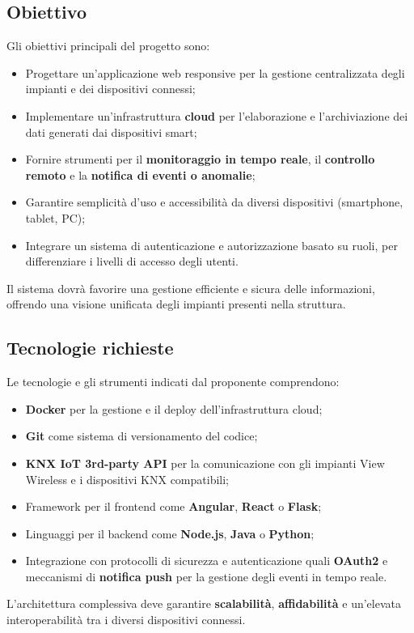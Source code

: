 \documentclass[a4paper,12pt]{article}
\begin{document}
{{{    \subsection{Obiettivo}
        Gli obiettivi principali del progetto sono:
        \begin{itemize}
            \item Progettare un’applicazione web responsive per la gestione centralizzata degli impianti e dei dispositivi connessi;
            \item Implementare un’infrastruttura \textbf{cloud} per l’elaborazione e l’archiviazione dei dati generati dai dispositivi smart;
            \item Fornire strumenti per il \textbf{monitoraggio in tempo reale}, il \textbf{controllo remoto} e la \textbf{notifica di eventi o anomalie};
            \item Garantire semplicità d’uso e accessibilità da diversi dispositivi (smartphone, tablet, PC);
            \item Integrare un sistema di autenticazione e autorizzazione basato su ruoli, per differenziare i livelli di accesso degli utenti.
        \end{itemize}
        Il sistema dovrà favorire una gestione efficiente e sicura delle informazioni, offrendo una visione unificata degli impianti presenti nella struttura.
    

    \subsection{Tecnologie richieste}
        Le tecnologie e gli strumenti indicati dal proponente comprendono:
        \begin{itemize}
            \item \textbf{Docker} per la gestione e il deploy dell’infrastruttura cloud;
            \item \textbf{Git} come sistema di versionamento del codice;
            \item \textbf{KNX IoT 3rd-party API} per la comunicazione con gli impianti View Wireless e i dispositivi KNX compatibili;
            \item Framework per il frontend come \textbf{Angular}, \textbf{React} o \textbf{Flask};
            \item Linguaggi per il backend come \textbf{Node.js}, \textbf{Java} o \textbf{Python};
            \item Integrazione con protocolli di sicurezza e autenticazione quali \textbf{OAuth2} e meccanismi di \textbf{notifica push} per la gestione degli eventi in tempo reale.
        \end{itemize}
        L’architettura complessiva deve garantire \textbf{scalabilità}, \textbf{affidabilità} e un’elevata interoperabilità tra i diversi dispositivi connessi.
    

}}}
\end{document}
